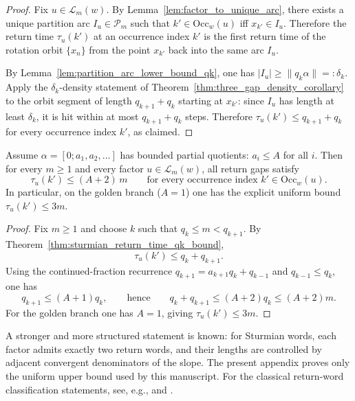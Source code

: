 \begin{proof}
Fix $u\in\mathcal{L}_m(w)$.
By Lemma~\ref{lem:factor_to_unique_arc}, there exists a unique partition arc $I_u\in\mathcal{P}_m$ such that $k'\in\mathrm{Occ}_w(u)$ iff $x_{k'}\in I_u$.
Therefore the return time $\tau_u(k')$ at an occurrence index $k'$ is the first return time of the rotation orbit $\{x_n\}$ from the point $x_{k'}$ back into the same arc $I_u$.

By Lemma~\ref{lem:partition_arc_lower_bound_qk}, one has $|I_u|\ge \|q_k\alpha\|=:\delta_k$.
Apply the $\delta_k$-density statement of Theorem~\ref{thm:three_gap_density_corollary} to the orbit segment of length $q_{k+1}+q_k$ starting at $x_{k'}$:
since $I_u$ has length at least $\delta_k$, it is hit within at most $q_{k+1}+q_k$ steps.
Therefore $\tau_u(k')\le q_{k+1}+q_k$ for every occurrence index $k'$, as claimed.
\end{proof}

\begin{corollary}\label{cor:sturmian_return_bounded_type_linear}
\MathTag Assume $\alpha=[0;a_1,a_2,\ldots]$ has bounded partial quotients: $a_i\le A$ for all $i$.
Then for every $m\ge 1$ and every factor $u\in\mathcal{L}_m(w)$, all return gaps satisfy
\[
\tau_u(k')\le (A+2)\,m
\qquad\text{for every occurrence index }k'\in\mathrm{Occ}_w(u).
\]
In particular, on the golden branch ($A=1$) one has the explicit uniform bound $\tau_u(k')\le 3m$.
\end{corollary}

\begin{proof}
Fix $m\ge 1$ and choose $k$ such that $q_k\le m<q_{k+1}$.
By Theorem~\ref{thm:sturmian_return_time_qk_bound},
\[
\tau_u(k')\le q_k+q_{k+1}.
\]
Using the continued-fraction recurrence $q_{k+1}=a_{k+1}q_k+q_{k-1}$ and $q_{k-1}\le q_k$, one has
\[
q_{k+1}\le (A+1)q_k,
\qquad\text{hence}\qquad
q_k+q_{k+1}\le (A+2)q_k\le (A+2)m.
\]
For the golden branch one has $A=1$, giving $\tau_u(k')\le 3m$.
\end{proof}

\begin{remark}\label{rem:sturmian_two_return_words_connection}
\AuditTag A stronger and more structured statement is known:
for Sturmian words, each factor admits exactly two return words, and their lengths are controlled by adjacent convergent denominators of the slope.
The present appendix proves only the uniform upper bound used by this manuscript.
For the classical return-word classification statements, see, e.g.,
\cite[Chs.\ 2--3]{Lothaire2002} and \cite[Ch.\ 6]{AlloucheShallit2003}.
\end{remark}


